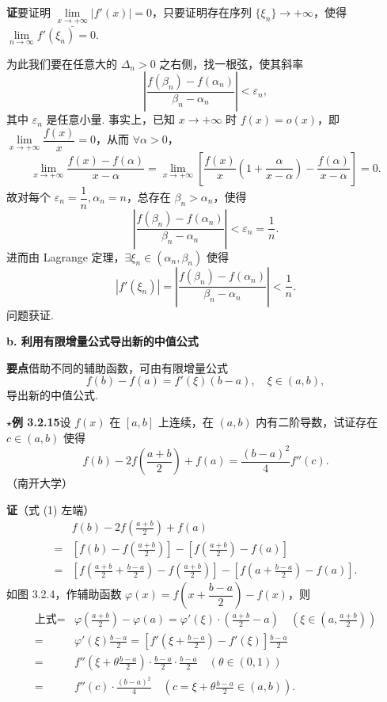 \documentclass[UTF8, 12pt, fontset=fandol, oneside]{ctexart}
\begin{document}
\noindent\textbf{证}\quad 要证明 $\underline{\lim\limits_{x\to+\infty}}|f'(x)|=0$，只要证明存在序列 $\{\xi_n\}\to+\infty$，使得 $\lim\limits_{n\to\infty}f'(\xi_n)=0$.

为此我们要在任意大的 $\Delta_n>0$ 之右侧，找一根弦，使其斜率
\[
  \left|\frac{f(\beta_n)-f(\alpha_n)}{\beta_n-\alpha_n}\right|<\varepsilon_n,
\]
其中 $\varepsilon_n$ 是任意小量. 事实上，已知 $x\to+\infty$ 时 $f(x)=o(x)$，即 $\lim\limits_{x\to+\infty}\dfrac{f(x)}x=0$，从而 $\forall\alpha>0$，
\[
  \lim_{x\to+\infty}\frac{f(x)-f(\alpha)}{x-\alpha}
  =\lim_{x\to+\infty}\left[\frac{f(x)}x\left(1+\frac{\alpha}{x-\alpha}\right)-\frac{f(\alpha)}{x-\alpha}\right]=0.
\]
故对每个 $\varepsilon_n=\dfrac1n,\alpha_n=n$，总存在 $\beta_n>\alpha_n$，使得
\[
  \left|\frac{f(\beta_n)-f(\alpha_n)}{\beta_n-\alpha_n}\right|<\varepsilon_n=\frac1n.
\]
进而由 Lagrange 定理，$\exists\xi_n\in(\alpha_n,\beta_n)$ 使得
\[
  |f'(\xi_n)|=\left|\frac{f(\beta_n)-f(\alpha_n)}{\beta_n-\alpha_n}\right|<\frac1n.
\]
问题获证.

\noindent\textbf{b. 利用有限增量公式导出新的中值公式}

\noindent\textbf{要点}\quad 借助不同的辅助函数，可由有限增量公式
\[
  f(b)-f(a)=f'(\xi)(b-a),\quad \xi\in(a,b),
\]
导出新的中值公式.

\noindent\textbf{$\star$例 3.2.15}\quad 设 $f(x)$ 在 $[a,b]$ 上连续，在 $(a,b)$ 内有二阶导数，试证存在 $c\in(a,b)$ 使得
\begin{equation}
  f(b)-2f\left(\frac{a+b}{2}\right)+f(a)=\frac{(b-a)^2}{4}f''(c).
\tag{1}
\end{equation}
（南开大学）

\noindent\textbf{证}\quad （式 (1) 左端）
\[
\begin{aligned}
& f(b)-2f\left(\frac{a+b}{2}\right)+f(a)\\
={}&\left[f(b)-f\left(\frac{a+b}{2}\right)\right]
-\left[f\left(\frac{a+b}{2}\right)-f(a)\right]\\
={}&\left[f\left(\frac{a+b}{2}+\frac{b-a}{2}\right)-f\left(\frac{a+b}{2}\right)\right]
-\left[f\left(a+\frac{b-a}{2}\right)-f(a)\right].
\end{aligned}
\]
如图 3.2.4，作辅助函数 $\varphi(x)=f\left(x+\dfrac{b-a}{2}\right)-f(x)$，则
\[
\begin{aligned}
\text{上式}
={}&\varphi\left(\frac{a+b}{2}\right)-\varphi(a)
=\varphi'(\xi)\cdot\left(\frac{a+b}{2}-a\right)
\quad\left(\xi\in\left(a,\frac{a+b}{2}\right)\right)\\
={}&\varphi'(\xi)\frac{b-a}{2}
=\left[f'\left(\xi+\frac{b-a}{2}\right)-f'(\xi)\right]\frac{b-a}{2}\\
={}&f''\left(\xi+\theta\frac{b-a}{2}\right)\cdot\frac{b-a}{2}\cdot\frac{b-a}{2}\quad(\theta\in(0,1))\\
={}&f''(c)\cdot\frac{(b-a)^2}{4}
\quad\left(c=\xi+\theta\frac{b-a}{2}\in(a,b)\right).
\end{aligned}
\]
\end{document}
